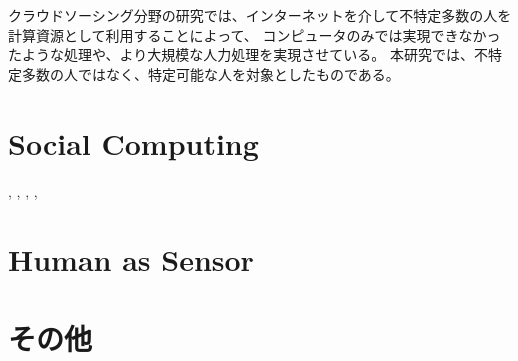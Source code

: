 クラウドソーシング分野の研究では、インターネットを介して不特定多数の人を計算資源として利用することによって、
コンピュータのみでは実現できなかったような処理や、より大規模な人力処理を実現させている。
本研究では、不特定多数の人ではなく、特定可能な人を対象としたものである。

\section{Social Computing}
\cite{dog},
\cite{jabberwocky},
\cite{personal-api},
\cite{social-machines},

\section{Human as Sensor}
\cite{prism}
\cite{moboq}
\cite{medusa}

\section{その他}
\cite{hapticturk}
\cite{sharedo}
